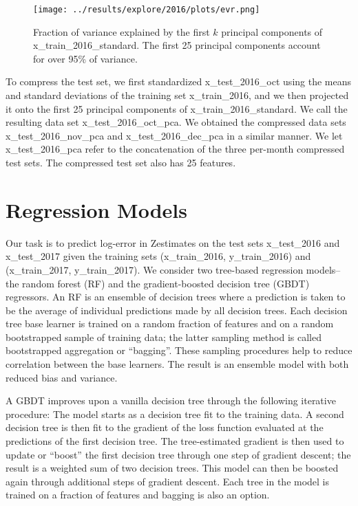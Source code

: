 \documentclass[12pt]{article}
\begin{document}
\begin{figure}
\centering
\texttt{[image: ../results/explore/2016/plots/evr.png]}
\caption{\label{fig-evr} Fraction of variance explained by the first $k$ principal components of x\_train\_2016\_standard. The first 25 principal components account for over 95\% of variance.}
\end{figure}

To compress the test set, we first standardized x\_test\_2016\_oct using the means and standard deviations of the training set x\_train\_2016, and we then projected it onto the first 25 principal components of x\_train\_2016\_standard. We call the resulting data set x\_test\_2016\_oct\_pca. We obtained the compressed data sets x\_test\_2016\_nov\_pca and x\_test\_2016\_dec\_pca in a similar manner. We let x\_test\_2016\_pca refer to the concatenation of the three per-month compressed test sets. The compressed test set also has 25 features.


\section{Regression Models}

Our task is to predict log-error in Zestimates on the test sets x\_test\_2016 and x\_test\_2017 given the training sets (x\_train\_2016, y\_train\_2016) and (x\_train\_2017, y\_train\_2017). We consider two tree-based regression models-- the random forest (RF) and the gradient-boosted decision tree (GBDT) regressors. An RF is an ensemble of decision trees where a prediction is taken to be the average of individual predictions made by all decision trees. Each decision tree base learner is trained on a random fraction of features and on a random bootstrapped sample of training data; the latter sampling method is called bootstrapped aggregation or ``bagging''. These sampling procedures help to reduce correlation between the base learners. The result is an ensemble model with both reduced bias and variance.

A GBDT improves upon a vanilla decision tree through the following iterative procedure: The model starts as a decision tree fit to the training data. A second decision tree is then fit to the gradient of the loss function evaluated at the predictions of the first decision tree. The tree-estimated gradient is then used to update or ``boost'' the first decision tree through one step of gradient descent; the result is a weighted sum of two decision trees. This model can then be boosted again through additional steps of gradient descent. Each tree in the model is trained on a fraction of features and bagging is also an option.
\end{document}
